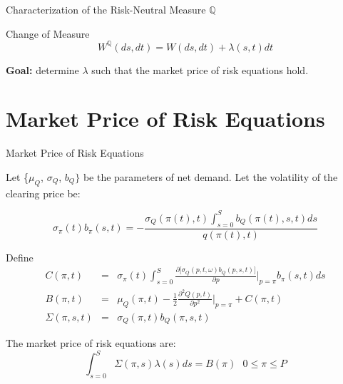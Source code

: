 \documentclass{beamer}
\begin{document}
\begin{frame}[shrink=30]{{\color{cyan}Characterization of the Risk-Neutral Measure $\mathbb{Q}$}}
\bigskip

\bigskip
\begin{block}{Change of Measure}
\begin{equation*}
W^{\mathbb{Q}}(ds,dt)=W(ds,dt)+\lambda (s,t)dt
\end{equation*}

\textbf{Goal:} determine $\lambda $ such that the market price of risk equations hold.
\end{block}

\end{frame}

\section{Market Price of Risk Equations}
\begin{frame}[shrink=30]{{\color{cyan}Market Price of Risk Equations}}

Let \{$%
\mu _{Q}$, $\sigma _{Q}$, $b_{Q}\}$ be the parameters of net demand.
Let the volatility of the clearing price be:

\begin{equation*}
\sigma _{\pi }(t)b_{\pi }(s,t)=-\frac{\sigma _{Q}(\pi
(t),t)\int_{s=0}^{S}b_{Q}(\pi (t),s,t)ds}{q(\pi (t),t)}
\end{equation*}

\bigskip
Define
\begin{eqnarray*}
C(\pi ,t) &=&\sigma _{\pi }(t)\int_{s=0}^{S}\frac{\partial \lbrack \sigma
_{Q}(p,t,\omega )b_{Q}(p,s,t)]}{\partial p}|_{p=\pi }b_{\pi }(s,t)ds \\
B(\pi ,t) &=&\mu _{Q}(\pi ,t)-\frac{1}{2}\frac{\partial ^{2}Q(p,t)}{\partial
p^{2}}|_{p=\pi }+C(\pi ,t) \\
\Sigma (\pi ,s,t) &=&\sigma _{Q}(\pi ,t)b_{Q}(\pi ,s,t)
\end{eqnarray*}

\bigskip
The market price of risk equations are:
\begin{equation*}
\int_{s=0}^{S}\Sigma (\pi ,s)\lambda (s)ds=B(\pi ) \text{ \ \ \ \ \ } 0\leq \pi \leq P
\end{equation*}

\end{frame}
\end{document}
